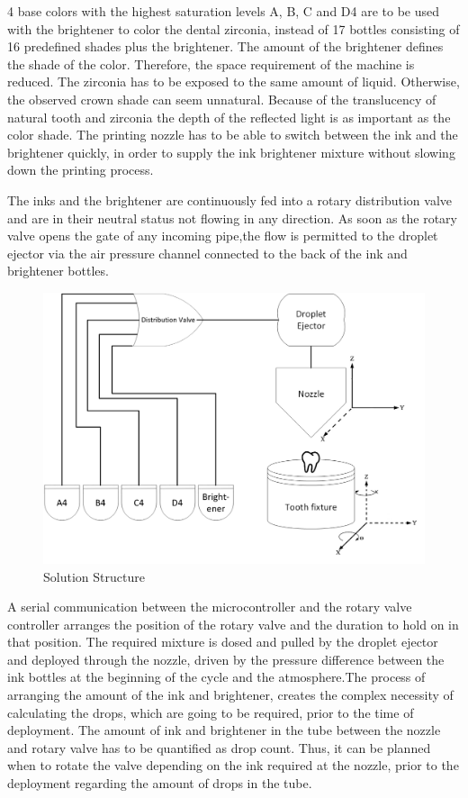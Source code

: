 4 base colors with the highest saturation levels A, B, C and D4 are to be used with the brightener to color the dental zirconia, instead of 17 bottles consisting of 16 predefined shades plus the brightener. The amount of the brightener defines the shade of the color. Therefore, the space requirement of the machine is reduced. The zirconia has to be exposed to the same amount of liquid. Otherwise, the observed crown shade can seem unnatural. Because of the translucency of natural tooth and zirconia the depth of the reflected light is as important as the color shade. The printing nozzle has to be able to switch between the ink and the brightener quickly, in order to supply the ink brightener mixture without slowing down the printing process. 

The inks and the brightener are continuously fed into a rotary distribution valve and are in their neutral status not flowing in any direction. As soon as the rotary valve opens the gate of any incoming pipe,the flow is permitted to the droplet ejector via the air pressure channel connected to the back of the ink and brightener bottles.  

\bigskip

\begin{figure}[H]
	\centering
	\includegraphics[width=1\textwidth]{grafiken/SolutionStructure.jpg}
	\caption{Solution Structure}
	\label{fig:SolutionStructure}
\end{figure} 

\bigskip

A serial communication between the microcontroller and the rotary valve controller arranges the position of the rotary valve and the duration to hold on in that position. The required mixture is dosed and pulled by the droplet ejector and deployed through the nozzle, driven by the pressure difference between the ink bottles at the beginning of the cycle and the atmosphere.The process of arranging the amount of the ink and brightener, creates the complex necessity of calculating the drops, which are going to be required, prior to the time of deployment. The amount of ink and brightener in the tube between the nozzle and rotary valve has to be quantified as drop count. Thus, it can be planned when to rotate the valve depending on the ink required at the nozzle, prior to the deployment regarding the amount of drops in the tube. 

